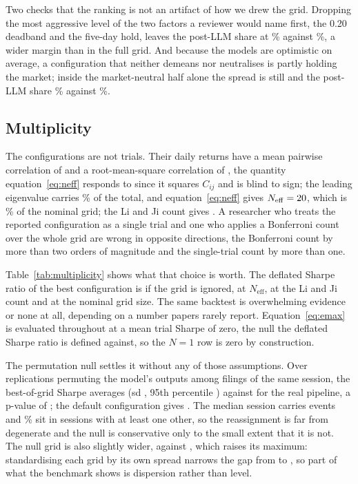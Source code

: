 \documentclass[sigconf]{acmart}
\begin{document}
Two checks that the ranking is not an artifact of how we drew the grid. Dropping the most aggressive
level of the two factors a reviewer would name first, the 0.20 deadband and the five-day hold,
leaves the post-LLM share at \VarShareTrimmedPostLLM{}\% against \VarShareTrimmedModel{}\%, a wider
margin than in the full grid. And because the models are optimistic on average, a configuration
that neither demeans nor neutralises is partly holding the market; inside the market-neutral half
alone the spread is still \NeutralOnlySD{} and the post-LLM share \NeutralOnlyPostLLM{}\% against
\NeutralOnlyModel{}\%.

\subsection{Multiplicity}
\label{sec:multiplicity}

The \NumConfigs{} configurations are not \NumConfigs{} trials. Their daily returns have a mean
pairwise correlation of \MeanCorr{} and a root-mean-square correlation of \RMSCorr{}, the quantity
equation~\eqref{eq:neff} responds to since it squares $C_{ij}$ and is blind to sign; the leading
eigenvalue carries \TopEigShare{}\% of the total,
and equation~\eqref{eq:neff} gives $N_{\mathrm{eff}} = 20{}$, which is \NeffPct{}\% of the
nominal grid; the Li and Ji count gives \NeffLiJi{}. A researcher who treats the reported
configuration as a single trial and one who applies a Bonferroni count over the whole grid are
wrong in opposite directions, the Bonferroni count by more than two orders of magnitude and the
single-trial count by more than one.

Table~\ref{tab:multiplicity} shows what that choice is worth. The deflated Sharpe ratio of the best
configuration is \DSRone{} if the grid is ignored, \DSRneff{} at $N_{\mathrm{eff}}$, \DSRliji{} at
the Li and Ji count and \DSRfull{} at the nominal grid size. The same backtest is overwhelming
evidence or none at all, depending on a number papers rarely report. Equation~\eqref{eq:emax} is
evaluated throughout at a mean trial Sharpe of zero, the null the deflated Sharpe ratio is defined
against, so the $N=1$ row is zero by construction.

The permutation null settles it without any of those assumptions. Over \PermReps{} replications
permuting the model's outputs among filings of the same session, the best-of-grid Sharpe averages
\NullMaxMean{} (sd \NullMaxSD{}, 95th percentile \NullMaxPninetyfive{}) against \SharpeBest{} for
the real pipeline, a p-value of \PermPBest{}; the default configuration gives \PermPDefaultDisp{}.
The median session carries \MedianEventsPerSession{} events and \FracEventsPermutable{}\% sit in
sessions with at least one other, so the reassignment is far from degenerate and the null is
conservative only to the small extent that it is not. The null grid is also slightly wider,
\NullGridSD{} against \SharpeSD{}, which raises its maximum: standardising each grid by its own
spread narrows the gap from \GapRaw{} to \GapStd{}, so part of what the benchmark shows is
dispersion rather than level.
\end{document}
